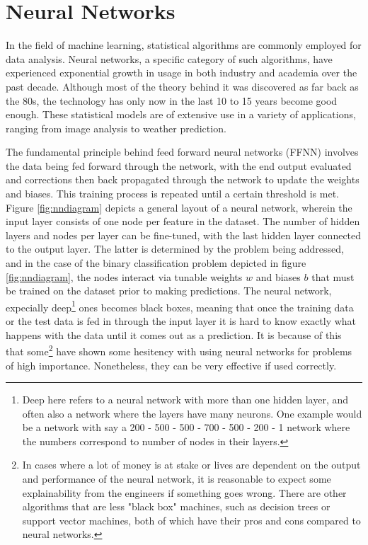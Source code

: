 \section{Neural Networks}
In the field of machine learning, statistical algorithms are commonly employed for data analysis. 
Neural networks, a specific category of such algorithms, have experienced exponential growth in 
usage in both industry and academia over the past decade. Although most of the theory behind it was 
discovered as far back as the 80s, the technology has only now in the last 10 to 15 years become good enough. 
These statistical models are of extensive use in a variety of applications, ranging from image analysis to 
weather prediction. \par 
The fundamental principle behind feed forward neural networks (FFNN) involves the 
data being fed forward through the network, with the end output evaluated and corrections then back 
propagated through the network to update the weights and biases. This training process is repeated 
until a certain threshold is met. Figure \ref{fig:nndiagram} depicts a general layout of a neural 
network, wherein the input layer consists of one node per feature in the dataset. The number of 
hidden layers and nodes per layer can be fine-tuned, with the last hidden layer connected to the 
output layer. The latter is determined by the problem being addressed, and in the case of the 
binary classification problem depicted in figure \ref{fig:nndiagram}, the nodes interact via 
tunable weights $w$ and biases $b$ that must be trained on the dataset prior to making predictions.
The neural network, expecially deep\footnote{Deep here refers to a neural network with more than 
one hidden layer, and often also a network where the layers have many neurons. One example would be a network with say a 
200 - 500 - 500 - 700 - 500 - 200 - 1 network where the numbers correspond to number of nodes in their layers.} 
ones becomes black boxes, meaning that once the training data or the test data is fed in through 
the input layer it is hard to know exactly what happens with the data until it comes out as a 
prediction. It is because of this that some\footnote{In cases where a lot of money is at stake or 
lives are dependent on the output and performance of the neural network, it is reasonable to expect 
some explainability from the engineers if something goes wrong. There are other algorithms that are less 
"black box" machines, such as decision trees\cite{Chen_2016} or support vector machines\cite{cortes1995support}, 
both of which have their pros and cons compared to neural networks.} have shown some hesitency 
with using neural networks for problems of high importance. Nonetheless, they can be very 
effective if used correctly. 

